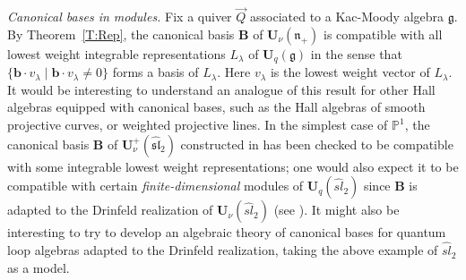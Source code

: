 \documentclass[a4paper,10pt]{amsart}
\def\U{\mathbf{U}}
\def\n{\mathfrak{n}}
\numberwithin{equation}{section}
\begin{document}
\vspace{.2in}

\noindent
\textit{Canonical bases in modules.}  Fix a quiver $\vec{Q}$ associated to a Kac-Moody algebra $\mathfrak{g}$. By Theorem~\ref{T:Rep}, the canonical basis
$\mathbf{B}$ of $\U_\nu(\n_+)$ is compatible with all lowest weight integrable representations $L_{\lambda}$ of $\U_q(\mathfrak{g})$ in the sense that $\{ \mathbf{b} \cdot v_{\lambda}\;|\; \mathbf{b} \cdot v_{\lambda} \neq 0\}$ forms a basis of $L_{\lambda}$. Here $v_{\lambda}$ is the lowest weight vector of $L_{\lambda}$.
It would be interesting to understand an analogue of this result for other Hall algebras equipped with canonical bases, such as the Hall algebras of smooth projective curves, or weighted projective lines. In the simplest case of $\mathbb{P}^1$, the canonical basis $\mathbf{B}$ of $\U_\nu^+(\widehat{\mathfrak{sl}}_2)$ constructed in \cite{SInvent} has been checked to be compatible with some integrable lowest weight representations; one would also expect it to be compatible with certain \textit{finite-dimensional} modules of $\U_q(\widehat{sl}_2)$ since $\mathbf{B}$ is adapted to the Drinfeld realization of $\U_\nu(\widehat{sl}_2)$ (see \cite[Lecture~4]{Trieste}). It might also be interesting to try to develop an algebraic theory of canonical bases for quantum loop algebras adapted to the Drinfeld realization, taking the above example of $\widehat{sl}_2$ as a model.

\vspace{.2in}
\end{document}
